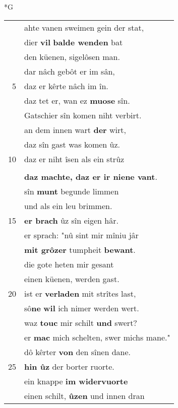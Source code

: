 \documentclass[8pt,a4paper,notitlepage]{article}
\begin{document}
\begin{table}[ht]
\begin{minipage}[t]{0.5\linewidth}
\small
\begin{center}*G
\end{center}
\begin{tabular}{rl}
 & ahte vanen sweimen gein der stat,\\ 
 & dier \textbf{vil} \textbf{balde wenden} bat\\ 
 & den küenen, sigelôsen man.\\ 
 & dar nâch gebôt er im sân,\\ 
5 & daz er kêrte nâch im în.\\ 
 & daz tet er, wan ez \textbf{muose} sîn.\\ 
 & Gatschier sîn komen niht verbirt.\\ 
 & an dem innen wart \textbf{der} wirt,\\ 
 & daz sîn gast was komen ûz.\\ 
10 & daz er niht îsen als ein strûz\\ 
 & \textbf{\begin{large}U\end{large}nd} \textbf{grôze} vlinse verslant,\\ 
 & \textbf{daz machte, daz er ir niene vant}.\\ 
 & sîn \textbf{munt} begunde limmen\\ 
 & und als ein leu brimmen.\\ 
15 & \textbf{er brach} ûz sîn eigen hâr.\\ 
 & er sprach: "nû sint mir mîniu jâr\\ 
 & \textbf{mit grôzer} tumpheit \textbf{bewant}.\\ 
 & die gote heten mir gesant\\ 
 & einen küenen, werden gast.\\ 
20 & ist er \textbf{verladen} mit strîtes last,\\ 
 & sô\textbf{ne} \textbf{wil} ich nimer werden wert.\\ 
 & waz \textbf{touc} mir schilt \textbf{und} swert?\\ 
 & er \textbf{mac} mich schelten, swer michs mane."\\ 
 & dô kêrter \textbf{von} den sînen dane.\\ 
25 & \textbf{hin ûz} der borter ruorte.\\ 
 & ein knappe \textbf{im widervuorte}\\ 
 & einen schilt, \textbf{ûzen} und innen dran\\ 

\end{tabular}
\end{minipage}
\end{table}
\end{document}
